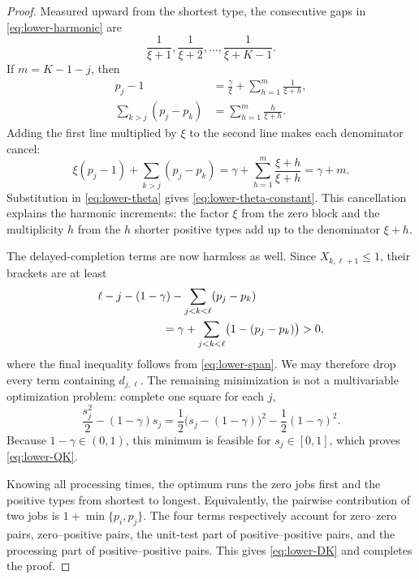 \begin{proof}
Measured upward from the shortest type, the consecutive gaps in
\cref{eq:lower-harmonic} are
\[
 \frac1{\xi+1},\frac1{\xi+2},\ldots,\frac1{\xi+K-1}.
\]
If $m=K-1-j$, then
\begin{align*}
 p_j-1
   &=\frac\gamma \xi+\sum_{h=1}^m\frac1{\xi+h},\\
 \sum_{k>j}(p_j-p_k)
   &=\sum_{h=1}^m\frac{h}{\xi+h}.
\end{align*}
Adding the first line multiplied by $\xi$ to the second line makes each
denominator cancel:
\begin{equation}
 \xi(p_j-1)+\sum_{k>j}(p_j-p_k)
 =\gamma+\sum_{h=1}^m\frac{\xi+h}{\xi+h}
 =\gamma+m.
 \label{eq:lower-telescope}
\end{equation}
Substitution in \cref{eq:lower-theta} gives
\cref{eq:lower-theta-constant}.  This cancellation explains the harmonic
increments: the factor $\xi$ from the zero block and the multiplicity $h$
from the $h$ shorter positive types add up to the denominator $\xi+h$.

The delayed-completion terms are now harmless as well.  Since
$X_{k,\ell+1}\le1$, their brackets are at least
\begin{align*}
 &\ell-j-(1-\gamma)
   -\sum_{j<k<\ell}(p_j-p_k)\\
 &\hspace{20mm}
 =\gamma+\sum_{j<k<\ell}\bigl(1-(p_j-p_k)\bigr)>0,
\end{align*}
where the final inequality follows from
\cref{eq:lower-span}.  We may therefore drop every term containing
$d_{j,\ell}$.  The remaining minimization is not a multivariable optimization
problem: complete one square for each $j$,
\[
  \frac{s_j^2}{2}-(1-\gamma)s_j
  =\frac12\bigl(s_j-(1-\gamma)\bigr)^2
   -\frac12(1-\gamma)^2.
\]
Because $1-\gamma\in(0,1)$, this minimum is feasible for
$s_j\in[0,1]$, which proves \cref{eq:lower-QK}.

Knowing all processing times,
the optimum runs the zero jobs first and the positive types from shortest to
longest.  Equivalently, the pairwise contribution of two jobs is
$1+\min\{p_i,p_j\}$.
The four terms respectively account for zero--zero pairs, zero--positive
pairs, the unit-test part of positive--positive pairs, and the processing
part of positive--positive pairs.  This gives \cref{eq:lower-DK} and
completes the proof.
\end{proof}

